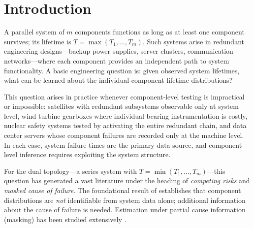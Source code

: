 \section{Introduction}
\label{sec:introduction}

A parallel system of $m$ components functions as long as at least one
component survives; its lifetime is $T = \max(T_1, \ldots, T_m)$.  Such
systems arise in redundant engineering designs---backup power supplies,
server clusters, communication networks---where each component provides
an independent path to system functionality.  A basic engineering
question is: given observed system lifetimes, what can be learned about
the individual component lifetime distributions?

This question arises in practice whenever component-level testing is
impractical or impossible: satellites with redundant subsystems
observable only at system level, wind turbine gearboxes where
individual bearing instrumentation is costly, nuclear safety systems
tested by activating the entire redundant chain, and data center
servers whose component failures are recorded only at the machine
level.  In each case, system failure times are the primary data source,
and component-level inference requires exploiting the system structure.

For the dual topology---a series system with
$T = \min(T_1, \ldots, T_m)$---this question has generated a vast
literature under the heading of \emph{competing risks} and
\emph{masked cause of failure}.  The foundational result of
\citet{Tsiatis1975} establishes that component distributions are
\emph{not} identifiable from system data alone; additional
information about the cause of failure is needed.  Estimation under
partial cause information (masking) has been studied extensively
\citep{Miyakawa1984, UsherHodgson1988, LinUsherGuess1993,
GuessUsherHodgson1991, KunduBasu2000, CraiuReiser2006}.

